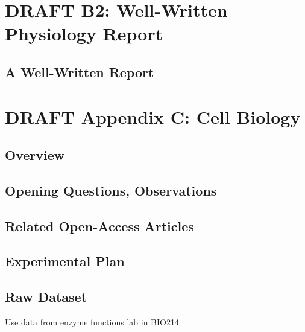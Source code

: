 \documentclass[
]{book}
\begin{document}
\hypertarget{draft-b2-well-written-physiology-report}{%
\chapter*{DRAFT B2: Well-Written Physiology Report}\label{draft-b2-well-written-physiology-report}}

\hypertarget{appb825}{%
\section{A Well-Written Report}\label{appb825}}

\hypertarget{draft-appendix-c-cell-biology}{%
\chapter*{DRAFT Appendix C: Cell Biology}\label{draft-appendix-c-cell-biology}}

\hypertarget{appc830}{%
\section{Overview}\label{appc830}}

\hypertarget{opening-questions-observations-2}{%
\section{Opening Questions, Observations}\label{opening-questions-observations-2}}

\hypertarget{related-open-access-articles-2}{%
\section{Related Open-Access Articles}\label{related-open-access-articles-2}}

\hypertarget{experimental-plan-2}{%
\section{Experimental Plan}\label{experimental-plan-2}}

\hypertarget{raw-dataset-2}{%
\section{Raw Dataset}\label{raw-dataset-2}}

Use data from enzyme functions lab in BIO214
\end{document}
